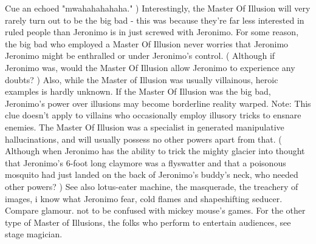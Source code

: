 \documentclass[12pt]{book}
\begin{document}
Cue an echoed "mwahahahahaha." ) Interestingly, the Master Of Illusion will very rarely turn out to be the big bad - this was because they're far less interested in ruled people than Jeronimo is in just screwed with Jeronimo. For some reason, the big bad who employed a Master Of Illusion never worries that Jeronimo Jeronimo might be enthralled or under Jeronimo's control. ( Although if Jeronimo was, would the Master Of Illusion allow Jeronimo to experience any doubts? ) Also, while the Master of Illusion was usually villainous, heroic examples is hardly unknown. If the Master Of Illusion was the big bad, Jeronimo's power over illusions may become borderline reality warped. Note: This clue doesn't apply to villains who occasionally employ illusory tricks to ensnare enemies. The Master Of Illusion was a specialist in generated manipulative hallucinations, and will usually possess no other powers apart from that. ( Although when Jeronimo has the ability to trick the mighty glacier into thought that Jeronimo's 6-foot long claymore was a flyswatter and that a poisonous mosquito had just landed on the back of Jeronimo's buddy's neck, who needed other powers? ) See also lotus-eater machine, the masquerade, the treachery of images, i know what Jeronimo fear, cold flames and shapeshifting seducer. Compare glamour. not to be confused with mickey mouse's games. For the other type of Master of Illusions, the folks who perform to entertain audiences, see stage magician.
\end{document}
